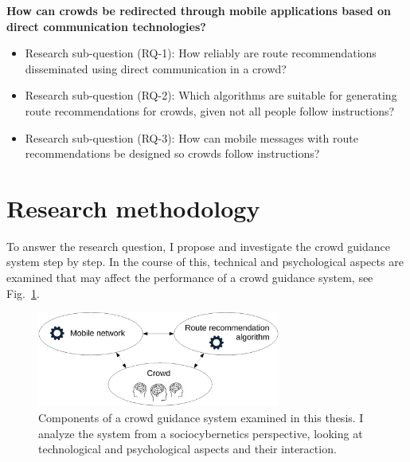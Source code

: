 \vspace{0.2cm}

\label{reserachquestions}
\begin{tcolorbox}[title=Research question (RQ)]
\textbf{How can crowds be redirected through mobile applications based on direct communication technologies?}


\begin{itemize}
\item {Research sub-question (RQ-1):} How reliably are route recommendations disseminated using direct communication in a crowd?
\item {Research sub-question (RQ-2):} Which algorithms are suitable for generating route recommendations for crowds, given not all people follow instructions?
\item {Research sub-question (RQ-3):} How can mobile messages with route recommendations be designed so crowds follow instructions?
\end{itemize}
\end{tcolorbox}








\section{Research methodology}

To answer the research question, I propose and investigate the crowd guidance system step by step. In the course of this, technical and psychological aspects are examined that may affect the performance of a crowd guidance system, see Fig.~\ref{fig:techpsycho}.


\begin{figure}[hbt!]
\centering
\includegraphics[width=8cm]{../figures/introduction/system.pdf} 
\caption{Components of a crowd guidance system examined in this thesis. I analyze the system from a sociocybernetics perspective, looking at technological and psychological aspects and their interaction.}
\label{fig:techpsycho}
\end{figure}




